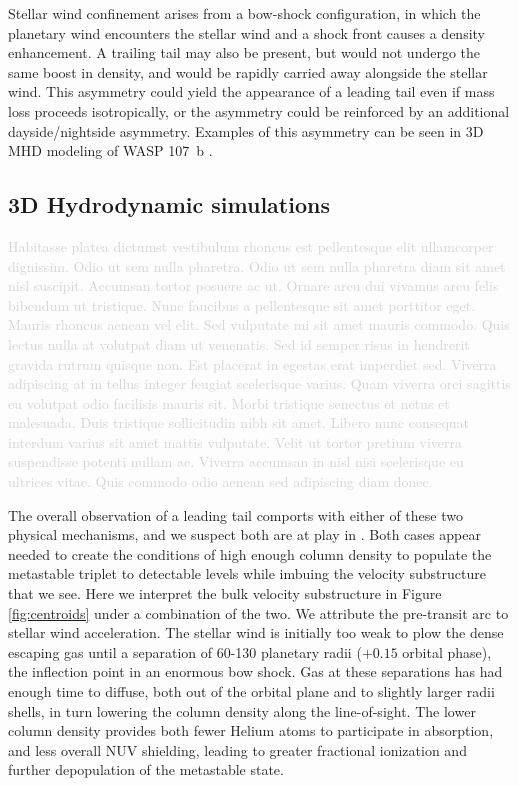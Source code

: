 \documentclass[twocolumn]{aastex631}
\newcommand{\hatpb}{\object{HAT-P-67 b}}
\begin{document}
Stellar wind confinement \citep{2022ApJ...926..226M} arises from a bow-shock configuration, in which the planetary wind encounters the stellar wind and a shock front causes a density enhancement.  A trailing tail may also be present, but would not undergo the same boost in density, and would be rapidly carried away alongside the stellar wind.  This asymmetry could yield the appearance of a leading tail even if mass loss proceeds isotropically, or the asymmetry could be reinforced by an additional dayside/nightside asymmetry.  Examples of this asymmetry can be seen in 3D MHD modeling of WASP 107~b \citep{2022ApJ...926..226M}.

\subsection{3D Hydrodynamic simulations}
\textcolor{lightgray}{Habitasse platea dictumst vestibulum rhoncus est pellentesque elit ullamcorper dignissim. Odio ut sem nulla pharetra. Odio ut sem nulla pharetra diam sit amet nisl suscipit. Accumsan tortor posuere ac ut. Ornare arcu dui vivamus arcu felis bibendum ut tristique. Nunc faucibus a pellentesque sit amet porttitor eget. Mauris rhoncus aenean vel elit. Sed vulputate mi sit amet mauris commodo. Quis lectus nulla at volutpat diam ut venenatis. Sed id semper risus in hendrerit gravida rutrum quisque non. Est placerat in egestas erat imperdiet sed. Viverra adipiscing at in tellus integer feugiat scelerisque varius. Quam viverra orci sagittis eu volutpat odio facilisis mauris sit. Morbi tristique senectus et netus et malesuada. Duis tristique sollicitudin nibh sit amet. Libero nunc consequat interdum varius sit amet mattis vulputate. Velit ut tortor pretium viverra suspendisse potenti nullam ac. Viverra accumsan in nisl nisi scelerisque eu ultrices vitae. Quis commodo odio aenean sed adipiscing diam donec.}

The overall observation of a leading tail comports with either of these two physical mechanisms, and we suspect both are at play in \hatpb.  Both cases appear needed to create the conditions of high enough column density to populate the  metastable triplet to detectable levels while imbuing the velocity substructure that we see.  Here we interpret the bulk velocity substructure in Figure \ref{fig:centroids} under a combination of the two.  We attribute the pre-transit arc to stellar wind acceleration.  The stellar wind is initially too weak to plow the dense escaping gas until a separation of 60-130 planetary radii ($+0.15$ orbital phase), the inflection point in an enormous bow shock.  Gas at these separations has had enough time to diffuse, both out of the orbital plane and to slightly larger radii shells, in turn lowering the column density along the line-of-sight.  The lower column density provides both fewer Helium atoms to participate in absorption, and less overall NUV shielding, leading to greater fractional ionization and further depopulation of the  metastable state.
\end{document}
